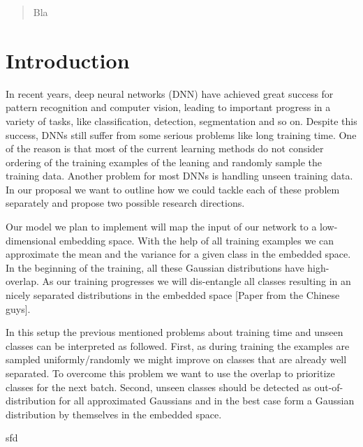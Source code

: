\begin{abstract}
	Bla
\end{abstract}

\section{Introduction}
In recent years, deep neural networks (DNN) have achieved great success for pattern recognition and computer vision, leading to important progress in a variety of tasks, like classification, detection, segmentation and so on. Despite this success, DNNs still suffer from some serious problems like long training time. One of the reason is that most of the current learning methods do not consider ordering of the training examples of the leaning and randomly sample the training data. Another problem for most DNNs is handling unseen training data. In our proposal we want to outline how we could tackle each of these problem separately and propose two possible research directions.

Our model we plan to implement will map the input of our network to a low-dimensional embedding space. With the help of all training examples we can approximate the 
mean and the variance for a given class in the embedded space. In the beginning of the training, all these Gaussian distributions have high-overlap. As our training progresses we will dis-entangle all classes resulting in an nicely separated distributions in the embedded space [Paper from the Chinese guys].

In this setup the previous mentioned problems about training time and unseen classes can be interpreted as followed.
First, as during training the examples are sampled uniformly/randomly we might improve on classes that are already well separated. To overcome this problem we want to use the overlap to prioritize classes for the next batch.
Second, unseen classes should be detected as out-of-distribution for all approximated Gaussians and in the best case form a Gaussian distribution by themselves in the embedded space.

sfd